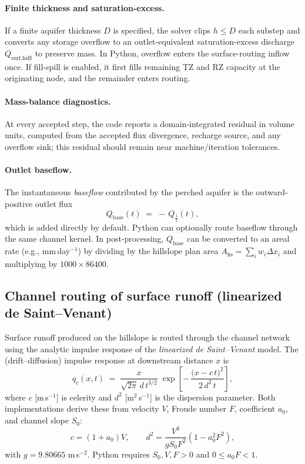 \documentclass[12pt]{article}
\begin{document}
\paragraph{Finite thickness and saturation-excess.}
If a finite aquifer thickness $D$ is specified, the solver clips $h\le D$ each substep and converts any storage overflow to an outlet-equivalent saturation-excess discharge $Q_{\text{surf,hsB}}$ to preserve mass. In Python, overflow enters the surface-routing inflow once. If fill-spill is enabled, it first fills remaining TZ and RZ capacity at the originating node, and the remainder enters routing.

\paragraph{Mass-balance diagnostics.}
At every accepted step, the code reports a domain-integrated residual in volume units, computed from the accepted flux divergence, recharge source, and any overflow sink; this residual should remain near machine/iteration tolerances.

\paragraph{Outlet baseflow.}
The instantaneous \emph{baseflow} contributed by the perched aquifer is the outward-positive outlet flux
\begin{equation}
Q_{\text{base}}(t) \;=\; -\,Q_{\frac12}(t),
\label{eq:hsb-qbase}
\end{equation}
which is added directly by default. Python can optionally route baseflow through the same channel kernel. In post-processing, $Q_{\text{base}}$ can be converted to an areal rate (e.g., mm\,day$^{-1}$) by dividing by the hillslope plan area $A_{\text{hs}}=\sum_i w_i\Delta x_i$ and multiplying by $1000\times 86400$.


\subsection{Channel routing of surface runoff (linearized de Saint--Venant)}

Surface runoff produced on the hillslope is routed through the channel network using the analytic impulse response of the \emph{linearized de Saint--Venant} model. The (drift--diffusion) impulse response at downstream distance $x$ is
\begin{equation}
q_c(x,t) \;=\; \frac{x}{\sqrt{2\pi}\, d\, t^{3/2}}\;
\exp\!\left[-\,\frac{\bigl(x - c\, t\bigr)^2}{2\, d^2\, t}\right],
\label{eq:qcx}
\end{equation}
where $c$ [m\,s$^{-1}$] is celerity and $d^2$ [m$^2$\,s$^{-1}$] is the dispersion parameter. Both implementations derive these from velocity $V$, Froude number $F$, coefficient $a_0$, and channel slope $S_0$:
\begin{equation}
c=(1+a_0)V,\qquad d^2=\frac{V^3}{gS_0F^2}(1-a_0^2F^2),
\end{equation}
with $g=9.80665$ m\,s$^{-2}$. Python requires $S_0,V,F>0$ and $0\le a_0F<1$.
\end{document}
